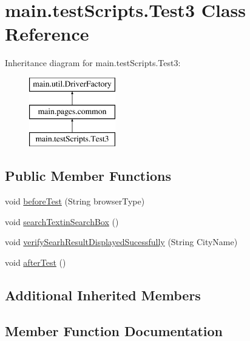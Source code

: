 \hypertarget{classmain_1_1test_scripts_1_1_test3}{}\section{main.\+test\+Scripts.\+Test3 Class Reference}
\label{classmain_1_1test_scripts_1_1_test3}
Inheritance diagram for main.\+test\+Scripts.\+Test3\+:\begin{figure}[H]
\begin{center}
\leavevmode
\includegraphics[height=3.000000cm]{classmain_1_1test_scripts_1_1_test3}
\end{center}
\end{figure}
\subsection*{Public Member Functions}
\begin{DoxyCompactItemize}
\item 
void \mbox{\hyperlink{classmain_1_1test_scripts_1_1_test3_a6def60a96025e336f8fa0d48c7de9707}{before\+Test}} (String browser\+Type)
\item 
void \mbox{\hyperlink{classmain_1_1test_scripts_1_1_test3_a7d7770a67e1c5d3b4412342457a039f6}{search\+Textin\+Search\+Box}} ()
\item 
void \mbox{\hyperlink{classmain_1_1test_scripts_1_1_test3_a1901c542d53d9249498e84984659df88}{verify\+Searh\+Result\+Displayed\+Sucessfully}} (String City\+Name)
\item 
void \mbox{\hyperlink{classmain_1_1test_scripts_1_1_test3_abacb83e061539da4aa9500d9ab76a98f}{after\+Test}} ()
\end{DoxyCompactItemize}
\subsection*{Additional Inherited Members}


\subsection{Member Function Documentation}
\mbox{\label{classmain_1_1test_scripts_1_1_test3_abacb83e061539da4aa9500d9ab76a98f}} 
